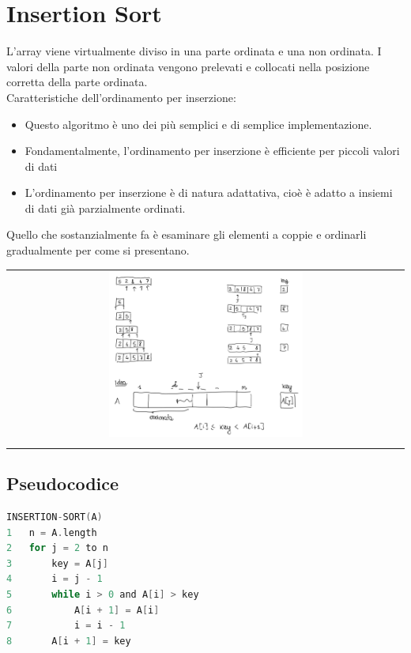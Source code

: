 \section{Insertion Sort}
L'array viene virtualmente diviso in una parte ordinata e una non ordinata. I valori della parte non ordinata vengono prelevati e collocati nella posizione corretta della parte ordinata. \\

Caratteristiche dell'ordinamento per inserzione:
\begin{itemize}
    \item Questo algoritmo è uno dei più semplici e di semplice implementazione.
    \item Fondamentalmente, l'ordinamento per inserzione è efficiente per piccoli valori di dati
    \item L'ordinamento per inserzione è di natura adattativa, cioè è adatto a insiemi di dati già parzialmente ordinati.
\end{itemize}
Quello che sostanzialmente fa è esaminare gli elementi a coppie e ordinarli gradualmente per come si presentano.

\begin{center}
    \begin{tabular}{c}
        \\ \includegraphics[width=0.5\textwidth]{image/InsertionSortExample.png} \\ \\
    \end{tabular}
\end{center}

\subsection{Pseudocodice}
\begin{mdframed}
\begin{lstlisting}[language=C]
INSERTION-SORT(A)
1   n = A.length
2   for j = 2 to n
3       key = A[j]
4       i = j - 1
5       while i > 0 and A[i] > key
6           A[i + 1] = A[i]
7           i = i - 1
8       A[i + 1] = key
\end{lstlisting}
\end{mdframed}

